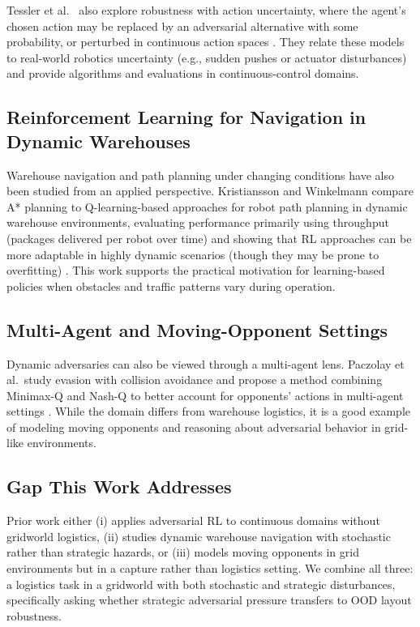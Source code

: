 \documentclass[sigconf]{aamas}
\begin{document}
Tessler et al.~ also explore robustness with action uncertainty, where the agent's chosen action may be replaced by an adversarial alternative with some probability, or perturbed in continuous action spaces \cite{tessler2019actionrobust}. They relate these models to real-world robotics uncertainty (e.g., sudden pushes or actuator disturbances) and provide algorithms and evaluations in continuous-control domains.

\subsection*{Reinforcement Learning for Navigation in Dynamic Warehouses}
Warehouse navigation and path planning under changing conditions have also been studied from an applied perspective. Kristiansson and Winkelmann compare A* planning to Q-learning-based approaches for robot path planning in dynamic warehouse environments, evaluating performance primarily using throughput (packages delivered per robot over time) and showing that RL approaches can be more adaptable in highly dynamic scenarios (though they may be prone to overfitting) \cite{kristiansson2025warehouse}. This work supports the practical motivation for learning-based policies when obstacles and traffic patterns vary during operation.  

\subsection*{Multi-Agent and Moving-Opponent Settings}
Dynamic adversaries can also be viewed through a multi-agent lens. Paczolay et al.~study evasion with collision avoidance and propose a method combining Minimax-Q and Nash-Q to better account for opponents' actions in multi-agent settings \cite{paczolay2021pursuitevasion}. While the domain differs from warehouse logistics, it is a good example of modeling moving opponents and reasoning about adversarial behavior in grid-like environments.

\subsection*{Gap This Work Addresses}
Prior work either (i) applies adversarial RL to continuous domains without
gridworld logistics, (ii) studies dynamic warehouse navigation with stochastic
rather than strategic hazards, or (iii) models moving opponents in grid environments but in a capture rather than logistics setting. We combine all three: a logistics task in a gridworld with both stochastic and strategic disturbances, specifically asking whether strategic adversarial pressure transfers to OOD layout robustness.
\end{document}
